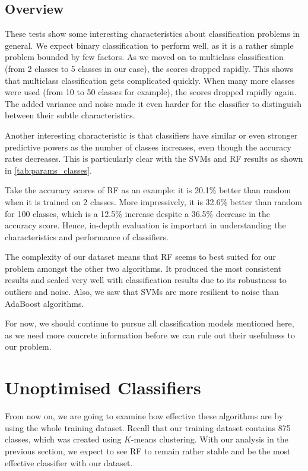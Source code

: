 \subsection{Overview}
These tests show some interesting characteristics about classification problems in general. We expect binary classification to perform well, as it is a rather simple problem bounded by few factors. As we moved on to multiclass classification (from 2 classes to 5 classes in our case), the scores dropped rapidly. This shows that multiclass classification gets complicated quickly. When many more classes were used (from 10 to 50 classes for example), the scores dropped rapidly again. The added variance and noise made it even harder for the classifier to distinguish between their subtle characteristics.

Another interesting characteristic is that classifiers have similar or even stronger predictive powers as the number of classes increases, even though the accuracy rates decreases. This is particularly clear with the SVMs and RF results as shown in \autoref{tab:params_classes}. 

Take the accuracy scores of RF as an example: it is 20.1\% better than random when it is trained on 2 classes. More impressively, it is 32.6\% better than random for 100 classes, which is a 12.5\% increase despite a 36.5\% decrease in the accuracy score. Hence, in-depth evaluation is important in understanding the characteristics and performance of classifiers. 

The complexity of our dataset means that RF seems to best suited for our problem amongst the other two algorithms. It produced the most consistent results and scaled very well with classification results due to its robustness to outliers and noise. Also, we saw that SVMs are more resilient to noise than AdaBoost algorithms. 

For now, we should continue to pursue all classification models mentioned here, as we need more concrete information before we can rule out their usefulness to our problem.

\section{Unoptimised Classifiers} \label{sec:res-unoptimised}
From now on, we are going to examine how effective these algorithms are by using the whole training dataset. Recall that our training dataset contains 875 classes, which was created using $K$-means clustering. With our analysis in the previous section, we expect to see RF to remain rather stable and be the most effective classifier with our dataset.


